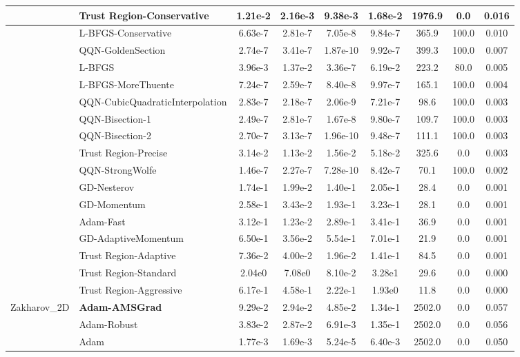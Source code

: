 \documentclass{article}
\begin{document}
\begin{longtable}{|l|l|c|c|c|c|c|c|c|}
\hline
 & Trust Region-Conservative & 1.21e-2 & 2.16e-3 & 9.38e-3 & 1.68e-2 & 1976.9 & 0.0 & 0.016 \\
\hline
 & L-BFGS-Conservative & 6.63e-7 & 2.81e-7 & 7.05e-8 & 9.84e-7 & 365.9 & 100.0 & 0.010 \\
\hline
 & QQN-GoldenSection & 2.74e-7 & 3.41e-7 & 1.87e-10 & 9.92e-7 & 399.3 & 100.0 & 0.007 \\
\hline
 & L-BFGS & 3.96e-3 & 1.37e-2 & 3.36e-7 & 6.19e-2 & 223.2 & 80.0 & 0.005 \\
\hline
 & L-BFGS-MoreThuente & 7.24e-7 & 2.59e-7 & 8.40e-8 & 9.97e-7 & 165.1 & 100.0 & 0.004 \\
\hline
 & QQN-CubicQuadraticInterpolation & 2.83e-7 & 2.18e-7 & 2.06e-9 & 7.21e-7 & 98.6 & 100.0 & 0.003 \\
\hline
 & QQN-Bisection-1 & 2.49e-7 & 2.81e-7 & 1.67e-8 & 9.80e-7 & 109.7 & 100.0 & 0.003 \\
\hline
 & QQN-Bisection-2 & 2.70e-7 & 3.13e-7 & 1.96e-10 & 9.48e-7 & 111.1 & 100.0 & 0.003 \\
\hline
 & Trust Region-Precise & 3.14e-2 & 1.13e-2 & 1.56e-2 & 5.18e-2 & 325.6 & 0.0 & 0.003 \\
\hline
 & QQN-StrongWolfe & 1.46e-7 & 2.27e-7 & 7.28e-10 & 8.42e-7 & 70.1 & 100.0 & 0.002 \\
\hline
 & GD-Nesterov & 1.74e-1 & 1.99e-2 & 1.40e-1 & 2.05e-1 & 28.4 & 0.0 & 0.001 \\
\hline
 & GD-Momentum & 2.58e-1 & 3.43e-2 & 1.93e-1 & 3.23e-1 & 28.1 & 0.0 & 0.001 \\
\hline
 & Adam-Fast & 3.12e-1 & 1.23e-2 & 2.89e-1 & 3.41e-1 & 36.9 & 0.0 & 0.001 \\
\hline
 & GD-AdaptiveMomentum & 6.50e-1 & 3.56e-2 & 5.54e-1 & 7.01e-1 & 21.9 & 0.0 & 0.001 \\
\hline
 & Trust Region-Adaptive & 7.36e-2 & 4.00e-2 & 1.96e-2 & 1.41e-1 & 84.5 & 0.0 & 0.001 \\
\hline
 & Trust Region-Standard & 2.04e0 & 7.08e0 & 8.10e-2 & 3.28e1 & 29.6 & 0.0 & 0.000 \\
\hline
 & Trust Region-Aggressive & 6.17e-1 & 4.58e-1 & 2.22e-1 & 1.93e0 & 11.8 & 0.0 & 0.000 \\
Zakharov\_2D & \textbf{Adam-AMSGrad} & 9.29e-2 & 2.94e-2 & 4.85e-2 & 1.34e-1 & 2502.0 & 0.0 & 0.057 \\
\hline
 & Adam-Robust & 3.83e-2 & 2.87e-2 & 6.91e-3 & 1.35e-1 & 2502.0 & 0.0 & 0.056 \\
\hline
 & Adam & 1.77e-3 & 1.69e-3 & 5.24e-5 & 6.40e-3 & 2502.0 & 0.0 & 0.050 \\

\end{longtable}
\end{document}
